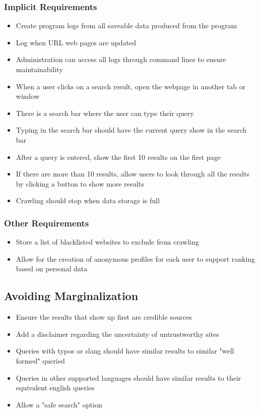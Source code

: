 \subsubsection*{Implicit Requirements}
\begin{itemize}
  \item Create program logs from all saveable data produced from the program
  \item Log when URL web pages are updated
  \item Administration can access all logs through command lines to ensure maintainability
  \item When a user clicks on a search result, open the webpage in another tab or window
  \item There is a search bar where the user can type their query
  \item Typing in the search bar should have the current query show in the search bar
  \item After a query is entered, show the first 10 results on the first page
  \item If there are more than 10 results, allow users to look through all the results by clicking a button to show more results
  \item Crawling should stop when data storage is full
\end{itemize}
\subsubsection*{Other Requirements}
\begin{itemize}
  \item Store a list of blacklisted websites to exclude from crawling
  \item Allow for the creation of anonymous profiles for each user to support ranking based on personal data
\end{itemize}

\subsection*{Avoiding Marginalization}
\begin{itemize}
  \item Ensure the results that show up first are credible sources
  \item Add a disclaimer regarding the uncertainty of untrustworthy sites
  \item Queries with typos or slang should have similar results to similar "well formed" queried
  \item Queries in other supported languages should have similar results to their equivalent english queries
  \item Allow a "safe search" option
\end{itemize}